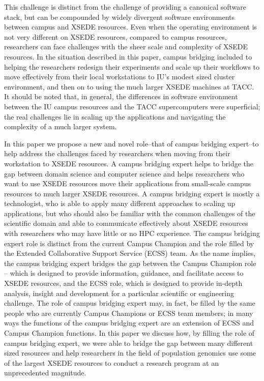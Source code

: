 \documentclass{sig-alternate}
\begin{document}
This challenge is distinct from the challenge of providing a canonical software stack, but can be compounded
by widely divergent software environments between campus and XSEDE resources. Even when the operating
environment is not very different on XSEDE resources, compared to campus resources, researchers can face
challenges with the sheer scale and complexity of XSEDE resources. In the situation described in this paper,
campus bridging included to helping the researchers redesign their experiments and scale up their workflows to
move effectively from their local workstations to IU's modest sized cluster environment, and then on to using
the much larger XSEDE machines at TACC. It should be noted that, in general, the differences in software
environment between the IU campus resources and the TACC supercomputers were superficial; the real challenges
lie in scaling up the applications and navigating the complexity of a much larger system.

In this paper we propose a new and novel role--that of campus bridging expert--to help address the challenges
faced by researchers when moving from their workstation to XSEDE resources. A campus bridging expert helps
to bridge the gap between domain science and computer science and helps researchers who want to use XSEDE
resources move their applications from small-scale campus resources to much larger XSEDE resources. A campus
bridging expert is mostly a technologist, who is able to apply many different approaches to scaling up
applications, but who should also be familiar with the common challenges of the scientific domain and able to
communicate effectively about XSEDE resources with researchers who may have little or no HPC experience. The
campus bridging expert role is distinct from the current Campus Champion and the role filled by the Extended
Collaborative Support Service (ECSS) team. As the name implies, the campus bridging expert bridges the gap
between the Campus Champion role -- which is designed to provide information, guidance, and facilitate access
to XSEDE resources, and the ECSS role, which is designed to provide in-depth analysis, insight and development
for a particular scientific or engineering challenge. The role of campus bridging expert may, in fact, be
filled by the same people who are currently Campus Champions or ECSS team members; in many ways the functions
of the campus bridging expert are an extension of ECSS and Campus Champion functions. In this paper we discuss
how, by filling the role of campus bridging expert, we were able to bridge the gap between many different
sized resources and help researchers in the field of population genomics use some of the largest XSEDE
resources to conduct a research program at an unprecedented magnitude.
\end{document}
